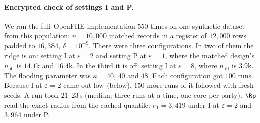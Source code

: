 \paragraph{Encrypted check of settings I and P.} We ran the full OpenFHE implementation $550$ times on one synthetic dataset from this population: $n = 10{,}000$ matched records in a register of $12{,}000$ rows padded to $16{,}384$, $\delta = 10^{-9}$. There were three configurations. In two of them the ridge is on: setting I at $\varepsilon = 2$ and setting P at $\varepsilon = 1$, where the matched design's $n_{\mathrm{off}}$ is $14.1$k and $16.4$k. In the third it is off: setting I at $\varepsilon = 8$, where $n_{\mathrm{off}}$ is $3.9$k. The flooding parameter was $\kappa = 40$, $40$ and $48$. Each configuration got $100$ runs. Because I at $\varepsilon = 2$ came out low (below), $150$ more runs of it followed with fresh seeds. A run took $21$--$23$\,s (median; three runs at a time, one core per party). $\Rp$ read the exact radius from the cached quantile: $r_1 = 3{,}419$ under I at $\varepsilon = 2$ and $3{,}964$ under P.
